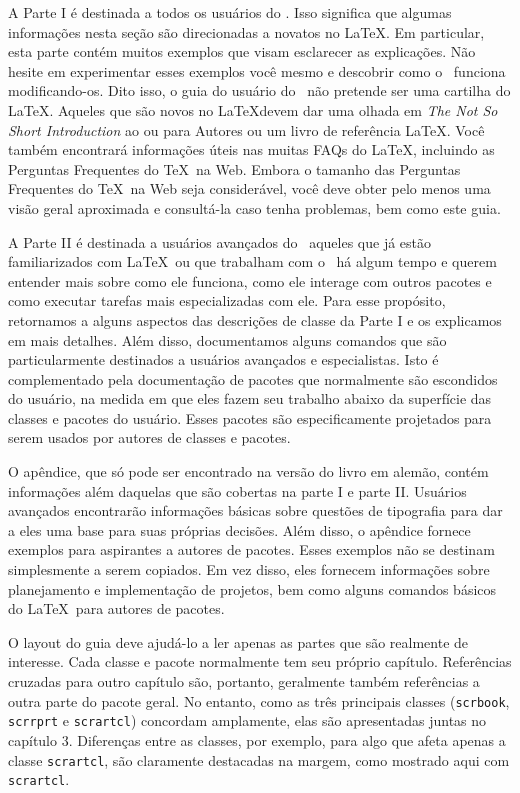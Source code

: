 A Parte I é destinada a todos os usuários do \KOMAScript. Isso significa que algumas informações nesta seção são direcionadas a novatos no \LaTeX. Em particular, esta parte contém muitos exemplos que visam esclarecer as explicações. Não hesite em experimentar esses exemplos você mesmo e descobrir como o \KOMAScript\ funciona modificando-os. Dito isso, o guia do usuário do \KOMAScript\ não pretende ser uma cartilha do \LaTeX. Aqueles que são novos no \LaTeX devem dar uma olhada em \textit{The Not So Short Introduction} ao \LaTeXe ou \LaTeXe para Autores ou um livro de referência \LaTeX. Você também encontrará informações úteis nas muitas FAQs do \LaTeX, incluindo as Perguntas Frequentes do \TeX\ na Web. Embora o tamanho das Perguntas Frequentes do \TeX\ na Web seja considerável, você deve obter pelo menos uma visão geral aproximada e consultá-la caso tenha problemas, bem como este guia.

A Parte II é destinada a usuários avançados do \KOMAScript\, aqueles que já estão familiarizados com \LaTeX\ ou que trabalham com o \KOMAScript\ há algum tempo e querem entender mais sobre como ele funciona, como ele interage com outros pacotes e como executar tarefas mais especializadas com ele. Para esse propósito, retornamos a alguns aspectos das descrições de classe da Parte I e os explicamos em mais detalhes. Além disso, documentamos alguns comandos que são particularmente destinados a usuários avançados e especialistas. Isto é complementado pela documentação de pacotes que normalmente são escondidos do usuário, na medida em que eles fazem seu trabalho abaixo da superfície das classes e pacotes do usuário. Esses pacotes são especificamente projetados para serem usados por autores de classes e pacotes.

O apêndice, que só pode ser encontrado na versão do livro em alemão, contém informações além daquelas que são cobertas na parte I e parte II. Usuários avançados encontrarão informações básicas sobre questões de tipografia para dar a eles uma base para suas próprias decisões. Além disso, o apêndice fornece exemplos para aspirantes a autores de pacotes. Esses exemplos não se destinam simplesmente a serem copiados. Em vez disso, eles fornecem informações sobre planejamento e implementação de projetos, bem como alguns comandos básicos do \LaTeX\ para autores de pacotes.

O layout do guia deve ajudá-lo a ler apenas as partes que são realmente de interesse. Cada classe e pacote normalmente tem seu próprio capítulo. Referências cruzadas para outro capítulo são, portanto, geralmente também referências a outra parte do pacote geral. No entanto, como as três principais classes (\texttt{scrbook}, \texttt{scrrprt} e \texttt{scrartcl}) concordam amplamente, elas são apresentadas juntas no capítulo 3. Diferenças entre as classes, por exemplo, para algo que afeta apenas a classe \texttt{scrartcl}, são claramente destacadas na margem, como mostrado aqui com \texttt{scrartcl}.

